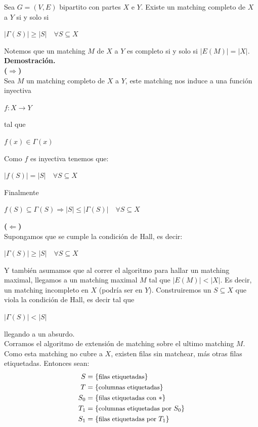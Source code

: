 \documentclass[11pt, a4paper]{article}
\theoremstyle{definition}
\begin{document}
Sea $G=(V,E)$ bipartito con partes $X$ e $Y$. Existe un matching completo de $X$ a $Y$ si y solo si 
\begin{center}
    $|\Gamma(S)| \geq |S| \quad \forall S \subseteq X$
\end{center}
Notemos que un matching $M$ de $X$ a $Y$ es completo si y solo si $|E(M)|=|X|$.
\textbf{Demostración.}\\
\textbf{($\Rightarrow$)}\\  
Sea $M$ un matching completo de $X$ a $Y$, este matching nos induce a una función inyectiva
\begin{center}
    $f: X \rightarrow Y$
\end{center}
tal que 
\begin{center}
    $f(x)\in \Gamma(x)$
\end{center}
Como $f$ es inyectiva tenemos que:
\begin{center}
    $|f(S)|=|S| \quad \forall S \subseteq X$
\end{center}
Finalmente 
\begin{center}
    $f(S) \subseteq \Gamma(S) \Rightarrow |S| \leq |\Gamma(S)| \quad \forall S \subseteq X$
\end{center}
\textbf{($\Leftarrow$)}\\ 
Supongamos que se cumple la condición de Hall, es decir: 
\begin{center}
    $|\Gamma(S)| \geq |S| \quad \forall S \subseteq X$
\end{center}
Y también asumamos que al correr el algoritmo para hallar un matching maximal, llegamos a un matching maximal $M$ tal que
$|E(M)| < |X|$. Es decir, un matching incompleto en $X$ (podría ser en $Y$). Construiremos un $S \subseteq X$ que viola la condición de Hall, es decir tal que
\begin{center}
    $|\Gamma(S)| < |S|$
\end{center}
llegando a un absurdo.\\
Corramos el algoritmo de extensión de matching sobre el ultimo matching $M$. Como esta matching no cubre a $X$, existen filas sin matchear, más otras filas etiquetadas.
Entonces sean:
\begin{align*}
    S & = \{\text{\small filas etiquetadas}\} \\
    T & = \{\text{\small columnas etiquetadas}\} \\
    S_0 & = \{\text{\small filas etiquetadas con }*\} \\
    T_1 & = \{\text{\small columnas etiquetadas por }S_0\} \\
    S_1 & = \{\text{\small filas etiquetadas por } T_1\}
 \end{align*}
\end{document}

